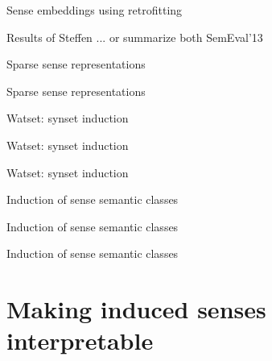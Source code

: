 \documentclass[usenames,dvipsnames]{beamer}
\begin{document}
\begin{frame}{Sense embeddings using retrofitting}

Results of Steffen ... or summarize both SemEval'13 

\end{frame}



\begin{frame}{Sparse sense representations}
	
\end{frame}


\begin{frame}{Sparse sense representations}
	
\end{frame}

\begin{frame}{Watset: synset induction}
	
\end{frame}


\begin{frame}{Watset: synset induction}
	
\end{frame}


\begin{frame}{Watset: synset induction}
	
\end{frame}


\begin{frame}{Induction of sense semantic classes}
	
\end{frame}

\begin{frame}{Induction of sense semantic classes}
	
\end{frame}

\begin{frame}{Induction of sense semantic classes}
	
\end{frame}

\section{Making induced senses interpretable}
\end{document}
